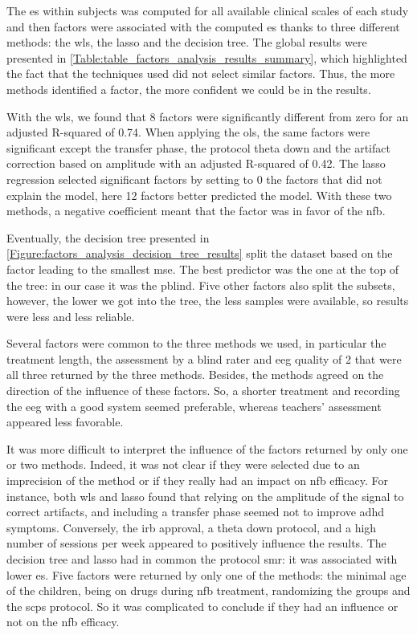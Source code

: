 The \gls{es} within subjects was computed for all available clinical scales of each study and then factors were associated with the computed \gls{es}
thanks to three different methods: the \gls{wls}, the \gls{lasso} and the decision tree. The global results were presented in \cref{Table:table_factors_analysis_results_summary},
which highlighted the fact that the techniques used did not select similar factors. Thus, the more methods identified a factor, the more confident we could be in
the results.  

With the \gls{wls}, we found that 8 factors were significantly different from zero for an adjusted R-squared of 0.74. 
When applying the \gls{ols}, the same factors were significant except the transfer phase, the protocol theta down and the artifact correction
based on amplitude with an adjusted R-squared of 0.42. The \gls{lasso} regression selected significant factors by setting to 0 the factors that did
not explain the model, here 12 factors better predicted the model. With these two methods, a negative coefficient meant that the factor was in favor of the \gls{nfb}.

Eventually, the decision tree presented in \cref{Figure:factors_analysis_decision_tree_results} split the dataset based on the factor leading to the
smallest \gls{mse}. The best predictor was the one at the top of the tree: in our case it was the \gls{pblind}. Five other factors also split the subsets,  
however, the lower we got into the tree, the less samples were available, so results were less and less reliable.

Several factors were common to the three methods we used, in particular the treatment length, the assessment 
by a blind rater and \gls{eeg} quality of 2 that were all three returned by the three methods. Besides, 
the methods agreed on the direction of the influence of these factors. So, a shorter treatment and recording the \gls{eeg} 
with a good system seemed preferable, whereas teachers' assessment appeared less favorable.

It was more difficult to interpret the influence of the factors returned by only one or two methods. Indeed, it was not clear if they were
selected due to an imprecision of the method or if they really had an impact on \gls{nfb} efficacy.
For instance, both \gls{wls} and \gls{lasso} found that relying on the amplitude of the signal to correct artifacts, and including a 
transfer phase seemed not to improve \gls{adhd} symptoms. Conversely, the \gls{irb} approval, a theta down protocol, and a high number 
of sessions per week appeared to positively influence the results. The decision tree and \gls{lasso} had in common the protocol \gls{smr}:
it was associated with lower \gls{es}. Five factors were returned by only one of the methods: the minimal age of the children, being on drugs 
during \gls{nfb} treatment, randomizing the groups and the \glspl{scp} protocol. So it was complicated to conclude if they had an influence or not
on the \gls{nfb} efficacy.

